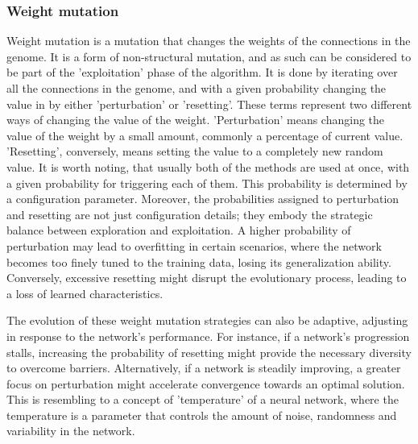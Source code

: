 \documentclass{article}
\begin{document}
\subsubsection{Weight mutation}
Weight mutation is a mutation that changes the weights of the connections in the genome. It is a form of non-structural mutation, and as such can be considered
to be part of the 'exploitation' phase of the algorithm. It is done by iterating over all the connections in the genome, and with a given probability changing
the value in by either 'perturbation' or 'resetting'. These terms represent two different ways of changing the value of the weight.
'Perturbation' means changing the value of the weight by a small amount, commonly a percentage of current value. 'Resetting', conversely, means setting
the value to a completely new random value. It is worth noting, that usually both of the methods are used at once, with a given probability for triggering
each of them. This probability is determined by a configuration parameter. 
Moreover, the probabilities assigned to perturbation and resetting are not just configuration details;
they embody the strategic balance between exploration and exploitation. A higher probability of perturbation may lead to overfitting in certain scenarios,
where the network becomes too finely tuned to the training data, losing its generalization ability.
Conversely, excessive resetting might disrupt the evolutionary process, leading to a loss of learned characteristics.

The evolution of these weight mutation strategies can also be adaptive, adjusting in response to the network's performance. For instance,
if a network's progression stalls, increasing the probability of resetting might provide the necessary diversity to overcome barriers.
Alternatively, if a network is steadily improving, a greater focus on perturbation might accelerate convergence towards an optimal solution.
This is resembling to a concept of 'temperature' of a neural network, where the temperature is a parameter that controls the amount of 
noise, randomness and variability in the network.
\end{document}
